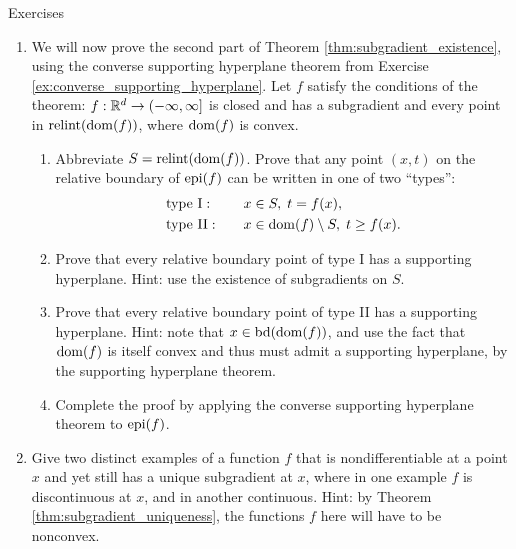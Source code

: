 \begin{xcb}{Exercises}
\begin{enumerate}[label=\thechapter.\arabic*]
\begin{enumerate}[label=\alph*.]
  \smallskip
  Since $y$ was arbitrary, note that we have shown $C^c \subseteq H^c$, that is,
  $H \subseteq C$, which together with the observation $C \subseteq H$, proves
  that $C = H$ and hence that $C$ is convex. 
\end{enumerate}

\item \label{ex:subdifferentiability_implies_convexity}
  We will now prove the second part of Theorem \ref{thm:subgradient_existence},  
  using the converse supporting hyperplane theorem from Exercise
  \ref{ex:converse_supporting_hyperplane}. Let $f$ satisfy the conditions of the 
  theorem: $f : \mathbb{R}^d \to (-\infty, \infty]$ is closed and has a subgradient and   
  every point in $\operatorname{relint}(\operatorname{dom}(f))$, where $\operatorname{dom}(f)$ is convex.

\begin{enumerate}[label=\alph*.]
\item Abbreviate $S = \operatorname{relint}(\operatorname{dom}(f))$. Prove that any point $(x,t)$ on the
  relative boundary of $\operatorname{epi}(f)$ can be written in one of two ``types'': 
  \begin{alignat*}{2}
  &\text{type I}: \quad &&x \in S, \; t = f(x), \\
  &\text{type II}: \quad &&x \in \operatorname{dom}(f) \setminus S, \; t \geq f(x). 
  \end{alignat*}

\item Prove that every relative boundary point of type I has a supporting
  hyperplane. Hint: use the existence of subgradients on $S$.

\item Prove that every relative boundary point of type II has a supporting
  hyperplane. Hint: note that $x \in \operatorname{bd}(\operatorname{dom}(f))$, and use the fact that
  $\operatorname{dom}(f)$ is itself convex and thus must admit a supporting hyperplane, by the 
  supporting hyperplane theorem.

\item Complete the proof by applying the converse supporting hyperplane theorem
  to $\operatorname{epi}(f)$. 
\end{enumerate}

\item \label{ex:subgradient_nonuniqueness} 
  Give two distinct examples of a function $f$ that is nondifferentiable at a
  point $x$ and yet still has a unique subgradient at $x$, where in one example
  $f$ is discontinuous at $x$, and in another continuous. Hint: by Theorem 
  \ref{thm:subgradient_uniqueness}, the functions $f$ here will have to be 
  nonconvex. 


\end{enumerate}
\end{xcb}
